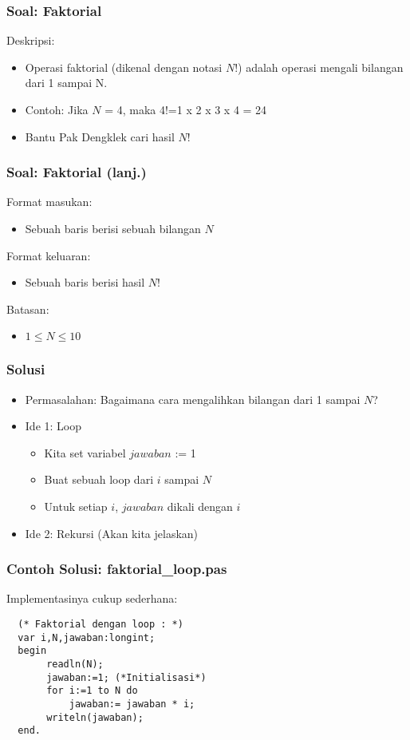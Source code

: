 \documentclass{beamer}
\begin{document}
\begin{frame}
\frametitle{Soal: Faktorial}
Deskripsi:
\begin{itemize}
        \item Operasi faktorial (dikenal dengan notasi $N$!) adalah operasi mengali bilangan dari 1 sampai N.
        \item Contoh: Jika $N$ = 4, maka 4!=1 x 2 x 3 x 4 = 24
        \item Bantu Pak Dengklek cari hasil $N$!
\end{itemize}
\end{frame}

\begin{frame}
\frametitle{Soal: Faktorial (lanj.) }
Format masukan:
\begin{itemize}
        \item Sebuah baris berisi sebuah bilangan $N$
\end{itemize}
Format keluaran:
\begin{itemize}
        \item Sebuah baris berisi hasil $N$!
\end{itemize}
Batasan:
\begin{itemize}
        \item $1 \le N \le 10$
\end{itemize}
\end{frame}

\begin{frame}
\frametitle{Solusi}
\begin{itemize}
        \item Permasalahan: Bagaimana cara mengalihkan bilangan dari 1 sampai $N$?
    \item Ide 1: Loop
    \begin{itemize}
       \item Kita set variabel $jawaban$ := 1
       \item Buat sebuah loop dari $i$ sampai $N$
       \item Untuk setiap $i$, $jawaban$ dikali dengan $i$
   \end{itemize}
   \item Ide 2: Rekursi (Akan kita jelaskan)
\end{itemize}
\end{frame}

\begin{frame}[fragile]
\frametitle{Contoh Solusi: faktorial\_loop.pas}
Implementasinya cukup sederhana:
\begin{lstlisting}
  (* Faktorial dengan loop : *)
  var i,N,jawaban:longint;
  begin
       readln(N);
       jawaban:=1; (*Initialisasi*)
       for i:=1 to N do
           jawaban:= jawaban * i;
       writeln(jawaban);
  end.
\end{lstlisting}
\end{frame}
\end{document}
